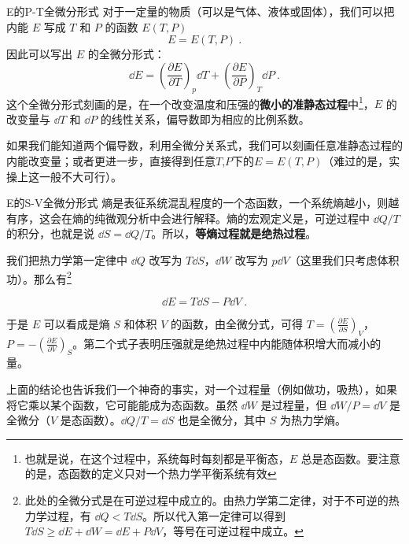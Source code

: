 \begin{example}{E的P-T全微分形式}
对于一定量的物质（可以是气体、液体或固体），我们可以把内能 $E$ 写成 $T$ 和 $P$ 的函数 $E(T,P)$
\begin{equation}
E=E(T,P)~.
\end{equation}
因此可以写出 $E$ 的全微分形式：
\begin{equation}
\dd E=\left(\frac{\partial E}{\partial T}\right)_p \dd T + \left(\frac{\partial E}{\partial P}\right)_T \dd P~.
\end{equation}
这个全微分形式刻画的是，在一个改变温度和压强的\textbf{微小的准静态过程}中\footnote{也就是说，在这个过程中，系统每时每刻都是平衡态，$E$ 总是态函数。要注意的是，态函数的定义只对一个热力学平衡系统有效}，$E$ 的改变量与 $\dd T$ 和 $\dd P$ 的线性关系，偏导数即为相应的比例系数。

如果我们能知道两个偏导数，利用全微分关系式，我们可以刻画任意准静态过程的内能改变量；或者更进一步，直接得到任意$T$,$P$下的$E=E(T,P)$（难过的是，实操上这一般不大可行）。
\end{example}

\begin{example}{E的S-V全微分形式}
熵是表征系统混乱程度的一个态函数，一个系统熵越小，则越有序，这会在熵的纯微观分析中会进行解释。熵的宏观定义是，可逆过程中 $\dd Q/T$ 的积分，也就是说 $\dd S=\dd Q/T$。所以，\textbf{等熵过程就是绝热过程}。

我们把热力学第一定律中 $\dd Q$ 改写为 $T\dd S$，$\dd W$ 改写为 $p\dd V$（这里我们只考虑体积功）。那么有\footnote{
此处的全微分式是在可逆过程中成立的。由热力学第二定律，对于不可逆的热力学过程，有 $\dd Q<T\dd S$。所以代入第一定律可以得到 $T\dd S\ge \dd E+\dd W=\dd E+P\dd V$，等号在可逆过程中成立。
}

\begin{equation}
\dd E=T\dd S-P\dd V~.
\end{equation}

于是 $E$ 可以看成是熵 $S$ 和体积 $V$ 的函数，由全微分式，可得 $T=\left(\frac{\partial E}{\partial S}\right)_V$，$P=-\left(\frac{\partial E}{\partial V}\right)_S$。第二个式子表明压强就是绝热过程中内能随体积增大而减小的量。

上面的结论也告诉我们一个神奇的事实，对一个过程量（例如做功，吸热），如果将它乘以某个函数，它可能能成为态函数。虽然 $\dd W$ 是过程量，但 $\dd W/P=\dd V$ 是全微分（$V$ 是态函数）。$\dd Q/T=\dd S$ 也是全微分，其中 $S$ 为热力学熵。
\end{example}

